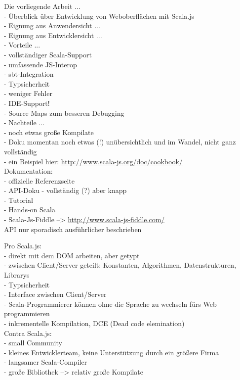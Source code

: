 \documentclass[a4paper, 12pt, hidelinks, listof=totoc, listoftables=totoc, bibliography=totoc]{scrreprt}
\begin{document}
Die vorliegende Arbeit ... \\
- Überblick über Entwicklung von Weboberflächen mit Scala.js \\
- Eignung aus Anwendersicht ... \\
- Eignung aus Entwicklersicht ... \\
- Vorteile ... \\
	- vollständiger Scala-Support \\
	- umfassende JS-Interop \\
	- sbt-Integration \\
	- Typsicherheit \\
		- weniger Fehler \\
		- \ac{IDE}-Support! \\
	- Source Maps zum besseren Debugging \\
- Nachteile ... \\
	- noch etwas große Kompilate \\
	- Doku momentan noch etwas (!) unübersichtlich und im Wandel, nicht ganz vollständig \\
		- ein Beispiel hier: \url{http://www.scala-js.org/doc/cookbook/} \\
		Dokumentation: \\
		- offizielle Referenzseite \\
		- \ac{API}-Doku - vollständig (?) aber knapp \\
		- Tutorial \\
		- Hands-on Scala \\
		- Scala-Js-Fiddle  -->  \url{http://www.scala-js-fiddle.com/} \\
		
		API nur sporadisch ausführlicher beschrieben

Pro Scala.js: \\
    - direkt mit dem \ac{DOM} arbeiten, aber getypt \\
    - zwischen Client/Server geteilt: Konstanten, Algorithmen, Datenstrukturen, Librarys \\
    - Typsicherheit \\
    - Interface zwischen Client/Server \\
    - Scala-Programmierer können ohne die Sprache zu wechseln fürs Web programmieren \\
    - inkrementelle Kompilation, DCE (Dead code elemination) \\
Contra Scala.js: \\
    - small Community \\
    - kleines Entwicklerteam, keine Unterstützung durch ein größere Firma \\
    - langsamer Scala-Compiler \\
    - große Bibliothek --> relativ große Kompilate \\
\end{document}
